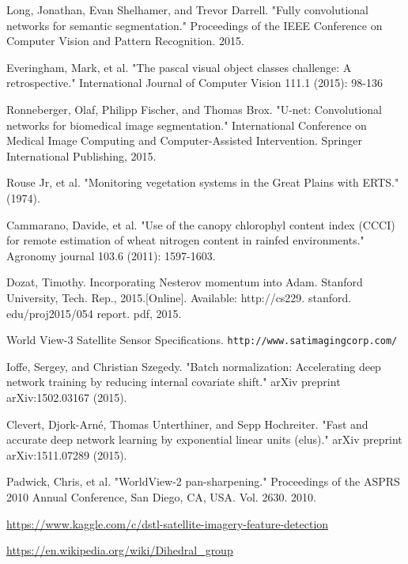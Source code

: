 \documentclass[10pt,twocolumn,letterpaper]{article}
\begin{document}
\begin{thebibliography}{20}

	 Long, Jonathan, Evan Shelhamer, and Trevor Darrell. "Fully convolutional networks for semantic segmentation." Proceedings of the IEEE Conference on Computer Vision and Pattern Recognition. 2015.

	 Everingham, Mark, et al. "The pascal visual object classes challenge: A retrospective." International Journal of Computer Vision 111.1 (2015): 98-136


	 Ronneberger, Olaf, Philipp Fischer, and Thomas Brox. "U-net: Convolutional networks for biomedical image segmentation." International Conference on Medical Image Computing and Computer-Assisted Intervention. Springer International Publishing, 2015.

	 Rouse Jr, et al. "Monitoring vegetation systems in the Great Plains with ERTS." (1974).

	 Cammarano, Davide, et al. "Use of the canopy chlorophyl content index (CCCI) for remote estimation of wheat nitrogen content in rainfed environments." Agronomy journal 103.6 (2011): 1597-1603.

	 Dozat, Timothy. Incorporating Nesterov momentum into Adam. Stanford University, Tech. Rep., 2015.[Online]. Available: http://cs229. stanford. edu/proj2015/054 report. pdf, 2015.

	 World View-3 Satellite Sensor Specifications.  \texttt{http://www.satimagingcorp.com/}

	 Ioffe, Sergey, and Christian Szegedy. "Batch normalization: Accelerating deep network training by reducing internal covariate shift." arXiv preprint arXiv:1502.03167 (2015).

	 Clevert, Djork-Arné, Thomas Unterthiner, and Sepp Hochreiter. "Fast and accurate deep network learning by exponential linear units (elus)." arXiv preprint arXiv:1511.07289 (2015).

	 Padwick, Chris, et al. "WorldView-2 pan-sharpening." Proceedings of the ASPRS 2010 Annual Conference, San Diego, CA, USA. Vol. 2630. 2010.

	 \url{https://www.kaggle.com/c/dstl-satellite-imagery-feature-detection}

	 \url{https://en.wikipedia.org/wiki/Dihedral_group}

\end{thebibliography}
\end{document}
